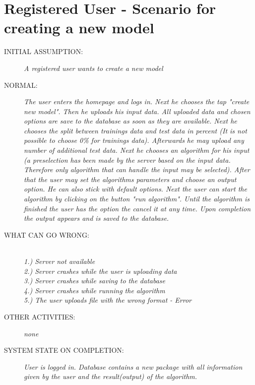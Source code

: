 \section{Registered User - Scenario for creating a new model}

\begin{description}
  \item [INITIAL ASSUMPTION:]
    \textit{A registered user wants to create a new model}
  \item [NORMAL:]
    \textit{The user enters the homepage and logs in. Next he chooses the tap "create new model". Then he uploads his input data. All uploaded data and chosen options are save to the database as soon as they are available. Next he chooses the split between trainings data and test data in percent (It is not possible to choose 0\% for trainings data). Afterwards he may upload any number of additional test data.  Next he chooses an algorithm for his input (a preselection has been made by the server based on the input data. Therefore only algorithm that can handle the input may be selected). After that the user may set the algorithms parameters and choose an output option. He can also stick with default options. Next the user can start the algorithm by clicking on the button "run algorithm". Until the algorithm is finished the user has the option the cancel it at any time. Upon completion the output appears and is saved to the database.}
  \item [WHAT CAN GO WRONG:]
    \textit{\\1.) Server not available \\2.) Server crashes while the user is uploading data \\3.) Server crashes while saving to the database \\4.) Server crashes while running the algorithm \\5.) The user uploads file with the wrong format - Error
}
  \item [OTHER ACTIVITIES:]
    \textit{none}
  \item [SYSTEM STATE ON COMPLETION:]
    \textit{User is logged in. Database contains a new package with all information given by the user and the result(output) of the algorithm.}
\end{description}

